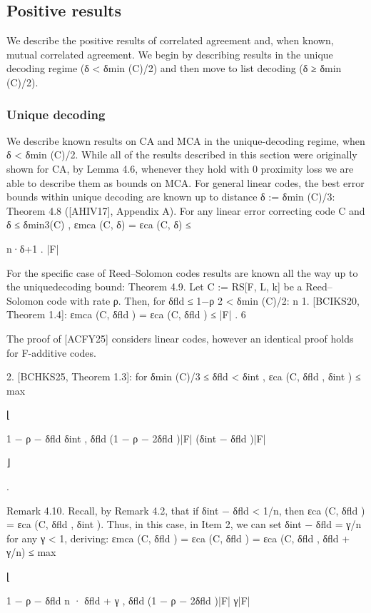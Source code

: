 \documentclass[11pt]{article}
\begin{document}
\subsection{Positive results}



We describe the positive results of correlated agreement and, when known, mutual correlated
agreement. We begin by describing results in the unique decoding regime (δ < δmin (C)/2) and then
move to list decoding (δ ≥ δmin (C)/2).

\subsubsection{Unique decoding}



We describe known results on CA and MCA in the unique-decoding regime, when δ < δmin (C)/2.
While all of the results described in this section were originally shown for CA, by Lemma 4.6,
whenever they hold with 0 proximity loss we are able to describe them as bounds on MCA.
For general linear codes, the best error bounds within unique decoding are known up to distance
δ := δmin (C)/3:
Theorem 4.8 ([AHIV17], Appendix A). For any linear error correcting code C and δ ≤ δmin3(C) ,
εmca (C, δ) = εca (C, δ) ≤

n·δ+1
.
|F|

For the specific case of Reed–Solomon codes results are known all the way up to the uniquedecoding bound:
Theorem 4.9. Let C := RS[F, L, k] be a Reed–Solomon code with rate ρ. Then, for δfld ≤ 1−ρ
2 <
δmin (C)/2:
n
1. [BCIKS20, Theorem 1.4]: εmca (C, δfld ) = εca (C, δfld ) ≤ |F|
.
6

The proof of [ACFY25] considers linear codes, however an identical proof holds for F-additive codes.

2. [BCHKS25, Theorem 1.3]: for δmin (C)/3 ≤ δfld < δint ,
εca (C, δfld , δint ) ≤ max

⌊

1 − ρ − δfld
δint
,
δfld (1 − ρ − 2δfld )|F| (δint − δfld )|F|

⌋

.

Remark 4.10. Recall, by Remark 4.2, that if δint − δfld < 1/n, then εca (C, δfld ) = εca (C, δfld , δint ).
Thus, in this case, in Item 2, we can set δint − δfld = γ/n for any γ < 1, deriving:
εmca (C, δfld ) = εca (C, δfld ) = εca (C, δfld , δfld + γ/n) ≤ max

⌊

1 − ρ − δfld
n · δfld + γ
,
δfld (1 − ρ − 2δfld )|F|
γ|F|
\end{document}

